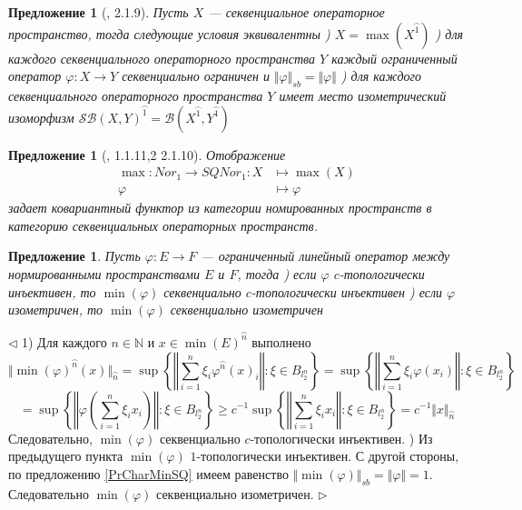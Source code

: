 \documentclass[12pt]{article}
\newtheorem{proposition}[theorem]{Предложение}
\newenvironment{proof}{\par $\triangleleft$}{$\triangleright$}
\begin{document}
\begin{proposition}[\cite{LamOpFolgen}, 2.1.9]\label{PrCharMaxSQ}
Пусть $X$ --- секвенциальное операторное пространство, тогда следующие условия эквивалентны
) $X=\max(X^{\wideparen{1}})$
) для каждого секвенциального операторного пространства $Y$ каждый ограниченный оператор $\varphi:X\to Y$ секвенциально  ограничен и $\Vert\varphi\Vert_{sb}=\Vert\varphi\Vert$
) для каждого секвенциального операторного пространства $Y$ имеет место изометрический изоморфизм $\mathcal{SB}(X,Y)^{\wideparen{1}}=\mathcal{B}(X^{\wideparen{1}},Y^{\wideparen{1}})$
\end{proposition}

\begin{proposition}[\cite{LamOpFolgen}, 1.1.11,2 2.1.10]\label{PrMaxFucntor}
Отображение
$$
\begin{aligned}
\max : Nor_1 \to SQNor_1 : X&\mapsto \max(X)\\
\varphi&\mapsto\varphi
\end{aligned}
$$
задает ковариантный функтор из категории номированных пространств в категорию секвенциальных операторных пространств.
\end{proposition}

\begin{proposition}\label{PrMinPreserveEmbedings} Пусть $\varphi:E\to F$ --- ограниченный линейный оператор между нормированными пространствами $E$ и $F$, тогда 
) если $\varphi$ $c$-топологически инъективен, то $\min(\varphi)$ секвенциально $c$-топологически инъективен
) если $\varphi$ изометричен, то $\min(\varphi)$ секвенциально изометричен
\end{proposition}
\begin{proof} 1) Для каждого $n\in\mathbb{N}$ и $x\in \min(E)^{\wideparen{n}}$ выполнено
$$
\Vert \min(\varphi)^{\wideparen{n}}(x)\Vert_{\wideparen{n}}
=\sup\left\{\left\Vert\sum\limits_{i=1}^n\xi_i \varphi^{\wideparen{n}}(x)_i\right\Vert:\xi\in B_{l_2^n}\right\}
=\sup\left\{\left\Vert\sum\limits_{i=1}^n\xi_i \varphi(x_i)\right\Vert:\xi\in B_{l_2^n}\right\}
$$
$$
=\sup\left\{\left\Vert\varphi\left(\sum\limits_{i=1}^n\xi_i x_i\right)\right\Vert:\xi\in B_{l_2^n}\right\}
\geq c^{-1}\sup\left\{\left\Vert\sum\limits_{i=1}^n\xi_i x_i\right\Vert:\xi\in B_{l_2^n}\right\}
=c^{-1}\Vert x\Vert_{\wideparen{n}}
$$
Следовательно, $\min(\varphi)$ секвенциально $c$-топологически инъективен.
) Из предыдущего пункта $\min(\varphi)$ $1$-топологически инъективен. С другой стороны, по предложению \ref{PrCharMinSQ} имеем равенство $\Vert\min(\varphi)\Vert_{sb}=\Vert\varphi\Vert=1$. Следовательно $\min(\varphi)$ секвенциально изометричен.
\end{proof}
\end{document}
